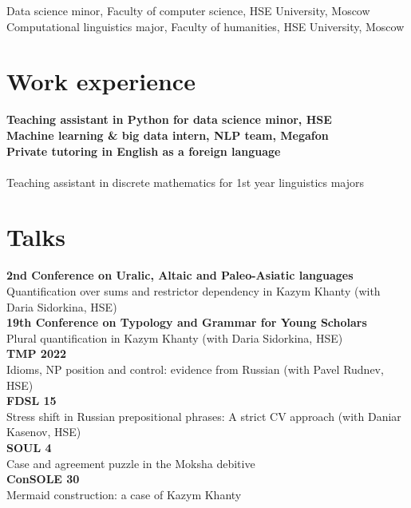 \documentclass[11pt]{article} %
\begin{document}
 Data science minor, Faculty of computer science, HSE University, Moscow\\
 Computational linguistics major, Faculty of humanities, HSE University, Moscow


\section*{Work experience}

 \textbf{Teaching assistant in Python for data science minor, HSE}\\
 \textbf{Machine learning \& big data intern, NLP team, Megafon}\\
 \textbf{Private tutoring in English as a foreign language}\\
\\
Teaching assistant in discrete mathematics for 1st year linguistics majors

\section*{Talks}

 \textbf{2nd Conference on Uralic, Altaic and Paleo-Asiatic languages}\\ Quantification over sums and restrictor dependency in Kazym Khanty (with Daria Sidorkina, HSE)\\
 \textbf{19th Conference on Typology and Grammar for Young Scholars}\\ Plural quantification in Kazym Khanty (with Daria Sidorkina, HSE)\\
 \textbf{TMP 2022} \\Idioms, NP position and control: evidence from Russian (with Pavel Rudnev, HSE)\\
 \textbf{FDSL 15} \\Stress shift in Russian prepositional phrases: A strict CV approach (with Daniar Kasenov, HSE)\\
 \textbf{SOUL 4}\\ Case and agreement puzzle in the Moksha debitive\\
 \textbf{ConSOLE 30}\\ Mermaid construction: a case of Kazym Khanty\\
\end{document}
